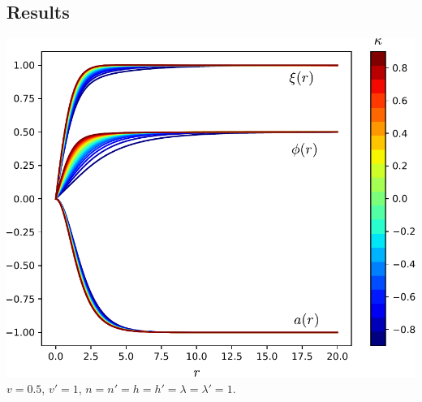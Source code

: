 \documentclass[14pt]{beamer}
\begin{document}
\subsection{Results}


\begin{frame}
  \includegraphics[scale=0.6]{chapters/figures/F0.pdf} %
$v=0.5$, $v'=1$, $n=n'=h=h'=\lambda=\lambda'=1$.
\end{frame}
\end{document}
